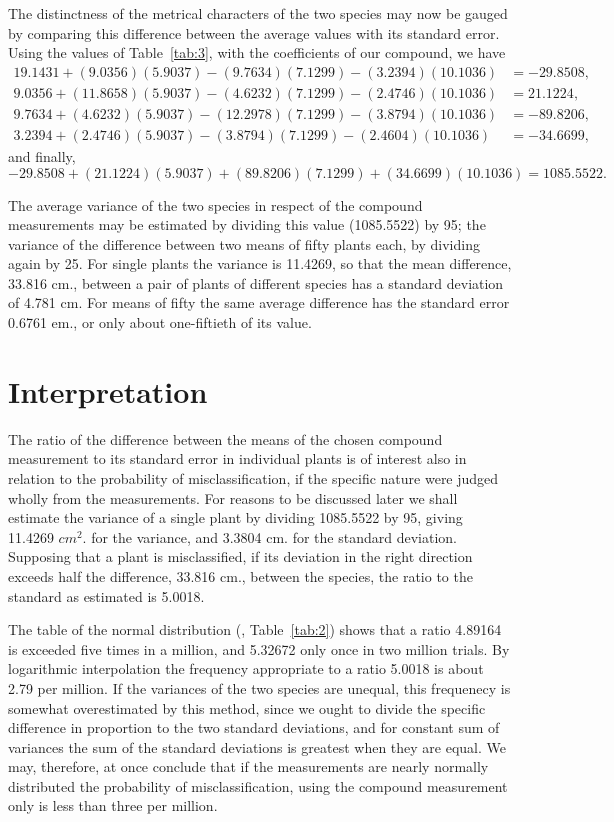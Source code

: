\documentclass[12pt]{article}
\begin{document}
The distinctness of the metrical characters of the two species may now be gauged by
comparing this difference between the average values with its standard error. Using the
values of Table~\ref{tab:3}, with the coefficients of our compound, we have
{\small
\[
\begin{aligned}
19.1431 + (9.0356)(5.9037) - (9.7634)(7.1299) - (3.2394)(10.1036) &= -29.8508,\\
9.0356 + (11.8658)(5.9037) - (4.6232)(7.1299) - (2.4746)(10.1036) &= 21.1224,\\
9.7634 + (4.6232)(5.9037) - (12.2978)(7.1299) - (3.8794)(10.1036) &= -89.8206,\\
3.2394 + (2.4746)(5.9037) - (3.8794)(7.1299) - (2.4604)(10.1036) &= -34.6699,
\end{aligned}
\] } and finally,
{\small
\[
-29.8508 + (21.1224)(5.9037) + (89.8206)(7.1299) + (34.6699)(10.1036) = 1085.5522.
\] }

The average variance of the two species in respect of the compound measurements may
be estimated by dividing this value (1085.5522) by 95; the variance of the difference
between two means of fifty plants each, by dividing again by 25. For single plants the
variance is 11.4269, so that the mean difference, 33.816 cm., between a pair of plants of
different species has a standard deviation of 4.781 cm. For means of fifty the same average
difference has the standard error 0.6761 em., or only about one-fiftieth of its value.

\section{Interpretation}

The ratio of the difference between the means of the chosen compound measurement
to its standard error in individual plants is of interest also in relation to the probability
of misclassification, if the specific nature were judged wholly from the measurements.
For reasons to be discussed later we shall estimate the variance of a single plant by dividing
1085.5522 by 95, giving 11.4269 $cm^2$. for the variance, and 3.3804 cm. for the standard
deviation. Supposing that a plant is misclassified, if its deviation in the right direction
exceeds half the difference, 33.816 cm., between the species, the ratio to the standard as
estimated is 5.0018.

The table of the normal distribution (\textit{}, Table~\ref{tab:2}) shows that a ratio
4.89164 is exceeded five times in a million, and 5.32672 only once in two million trials.
By logarithmic interpolation the frequency appropriate to a ratio 5.0018 is about 2.79 per
million. If the variances of the two species are unequal, this frequenecy is somewhat
overestimated by this method, since we ought to divide the specific difference in proportion
to the two standard deviations, and for constant sum of variances the sum of the standard
deviations is greatest when they are equal. We may, therefore, at once conclude that if
the measurements are nearly normally distributed the probability of misclassification,
using the compound measurement only is less than three per million.
\end{document}
